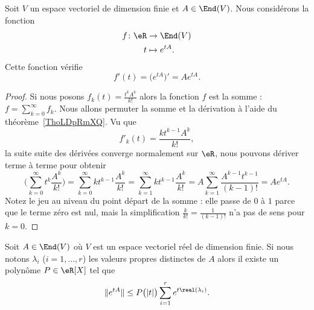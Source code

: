 \begin{proposition}
    Soit \( V\) un espace vectoriel de dimension finie et \( A\in\End(V)\). Nous considérons la fonction
    \begin{equation}
        \begin{aligned}
            f\colon \eR&\to \End(V) \\
            t&\mapsto  e^{tA}.
        \end{aligned}
    \end{equation}
    Cette fonction vérifie
    \begin{equation}
        f'(t)=\big(  e^{tA} \big)'=A e^{tA}.
    \end{equation}
\end{proposition}

\begin{proof}
    Si nous posons \( f_k(t)=\frac{ t^kA^k }{ k! }\) alors la fonction \( f\) est la somme : \( f=\sum_{k=0}^{\infty}f_k\). Nous allons permuter la somme et la dérivation à l'aide du théorème~\ref{ThoLDpRmXQ}. Vu que
    \begin{equation}
        f'_k(t)=\frac{ kt^{k-1}A^k }{ k! },
    \end{equation}
    la suite suite des dérivées converge normalement sur \( \eR\), nous pouvons dériver terme à terme pour obtenir
    \begin{equation}
        \Big( \sum_{k=0}^{\infty}t^k\frac{ A^k }{ k! } \Big)=\sum_{k=0}^{\infty}kt^{k-1}\frac{ A^k }{ k! }=\sum_{k=1}^{\infty}kt^{k-1}\frac{ A^k }{ k! }=A\sum_{k=1}^{\infty}\frac{ A^{k-1}t^{k-1} }{ (k-1)! }=A e^{tA}.
    \end{equation}
    Notez le jeu au niveau du point départ de la somme : elle passe de \( 0\) à \( 1\) parce que le terme zéro est nul, mais la simplification \( \frac{ k }{ k! }=\frac{ 1 }{ (k-1)! }\) n'a pas de sens pour \( k=0\).
\end{proof}

\begin{lemma}   \label{LemQEARooLRXEef}
    Soit \( A\in\End(V)\) où \( V\) est un espace vectoriel réel de dimension finie. Si nous notons \( \lambda_i\) (\( i=1,\ldots, r\)) les valeurs propres distinctes de $A$ alors il existe un polynôme \( P\in \eR[X]\) tel que
    \begin{equation}
        \|  e^{tA} \|\leq P\big( | t | \big)\sum_{i=1}^r e^{t\real(\lambda_i)}.
    \end{equation}
\end{lemma}

